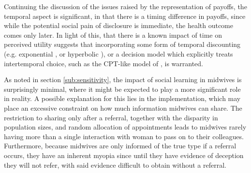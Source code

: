 Continuing the discussion of the issues raised by the representation of payoffs, the temporal aspect is significant, in that there is a timing difference in payoffs, since while the potential social pain of disclosure is immediate, the health outcome comes only later. In light of this, that there is a known impact of time on perceived utility \citet{Thaler1981} suggests that incorporating some form of temporal discounting (e.g. exponential \citep{Samuelson1937}, or hyperbolic \citep{Ainslie1991}), or a decision model which explicitly treats intertemporal choice, such as the \ac{CPT}-like model of \citet{Loewenstein1992}, is warranted. 

As noted in section \ref{sub:sensitivity}, the impact of social learning in midwives is surprisingly minimal, where it might be expected to play a more significant role in reality. A possible explanation for this lies in the implementation, which may place an excessive constraint on how much information midwives can share. The restriction to sharing only after a referral, together with the disparity in population sizes, and random allocation of appointments leads to midwives rarely having more than a single interaction with woman to pass on to their colleagues. Furthermore, because midwives are only informed of the true type if a referral occurs, they have an inherent myopia since until they have evidence of deception they will not refer, with said evidence difficult to obtain without a referral.

